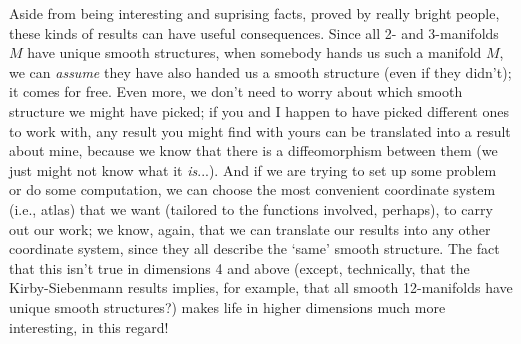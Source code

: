 \ssk

Aside from being interesting and suprising facts, proved by really bright people, these kinds 
of results can have useful consequences. Since all 2- and 3-manifolds $M$ have unique smooth 
structures, when somebody hands us such a manifold $M$, we can {\it assume} they have also 
handed us a smooth structure (even if they didn't); it comes for free. Even more, we don't
need to worry about which smooth structure we might have picked; if you and I happen to have
picked different ones to work with, any result you might find with yours can be translated
into a result about mine, because we know that there is a diffeomorphism between them (we just
might not know what it {\it is}...). And if we are trying to set up some problem or do some
computation, we can choose the most convenient coordinate system (i.e., atlas) that we want
(tailored to the functions involved, perhaps), to carry out our work; we know, again, that we
can translate our results into any other coordinate system, since they all describe the 
`same' smooth structure. The fact that this isn't true in dimensions 4 and above (except, 
technically, that the Kirby-Siebenmann results implies, for example, that all smooth 12-manifolds 
have unique smooth structures?) makes life in higher dimensions much more interesting, in 
this regard! 

\msk

